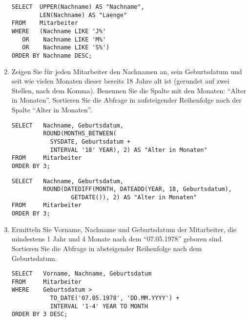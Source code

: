 \begin{enumerate}
        \begin{mssql}[\FALSE]
        \end{mssql}
        \begin{lstlisting}[language=ms_sql]
SELECT  UPPER(Nachname) AS "Nachname",
        LEN(Nachname) AS "Laenge"
FROM    Mitarbeiter
WHERE   (Nachname LIKE 'J%'
   OR    Nachname LIKE 'M%'
   OR    Nachname LIKE 'S%')
ORDER BY Nachname DESC;
        \end{lstlisting}
        \item Zeigen Sie für jeden Mitarbeiter den Nachnamen an, sein
        Geburtsdatum und seit wie vielen Monaten dieser bereits 18 Jahre alt ist
        (gerundet auf zwei Stellen, nach dem Komma). Benennen Sie die Spalte mit
        den Monaten: \enquote{Alter in Monaten}. Sortieren Sie die Abfrage in
        aufsteigender Reihenfolge nach der Spalte \enquote{Alter in Monaten}.
        \begin{oraclesql}[\FALSE]
        \end{oraclesql}
        \begin{lstlisting}[language=oracle_sql]
SELECT   Nachname, Geburtsdatum,
         ROUND(MONTHS_BETWEEN(
           SYSDATE, Geburtsdatum + 
           INTERVAL '18' YEAR), 2) AS "Alter in Monaten"
FROM     Mitarbeiter
ORDER BY 3;
       \end{lstlisting}
\clearpage
        \begin{mssql}[\FALSE]
        \end{mssql}
        \begin{lstlisting}[language=ms_sql]
SELECT   Nachname, Geburtsdatum,
         ROUND(DATEDIFF(MONTH, DATEADD(YEAR, 18, Geburtsdatum),
                 GETDATE()), 2) AS "Alter in Monaten"
FROM     Mitarbeiter
ORDER BY 3;
        \end{lstlisting}
        \item Ermitteln Sie Vorname, Nachname und Geburtsdatum der Mitarbeiter,
        die mindestens 1 Jahr und 4 Monate nach dem \enquote{07.05.1978} geboren
        sind. Sortieren Sie die Abfrage in absteigender Reihenfolge nach dem
        Geburtsdatum.
        \begin{oraclesql}[\FALSE]
        \end{oraclesql}
        \begin{lstlisting}[language=oracle_sql]
SELECT   Vorname, Nachname, Geburtsdatum
FROM     Mitarbeiter
WHERE    Geburtsdatum >
           TO_DATE('07.05.1978', 'DD.MM.YYYY') + 
           INTERVAL '1-4' YEAR TO MONTH
ORDER BY 3 DESC;
        \end{lstlisting}

\end{enumerate}

